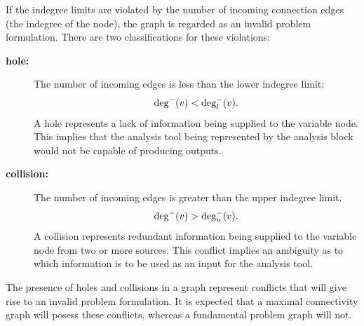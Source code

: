 If the indegree limits are violated by the number of incoming connection edges (the indegree of the node), the graph is regarded as an invalid problem formulation. There are two classifications for these violations:
  \begin{description}
    \item[\bf{hole:}] The number of incoming edges is less than the lower indegree limit:
      \begin{equation} 
\textrm{deg}^-(v) < \textrm{deg}_l^-(v). 
\label{e:hole} 
\end{equation}
      A hole represents a lack of information being supplied to the variable node. This implies that the analysis tool being represented by the analysis block would not be capable of producing outputs.
    \item[\bf{collision:}] The number of incoming edges is greater than the upper indegree limit. 
      \begin{equation} 
\textrm{deg}^-(v) > \textrm{deg}_u^-(v). 
\label{e:collision}
\end{equation}A collision represents redundant information being supplied to the variable node from two or more sources. This conflict implies an ambiguity as to which information is to be used as an input for the analysis tool.
  \end{description} 

%
%


  The presence of holes and collisions in a graph represent conflicts that will give
  rise to an invalid problem formulation. It is expected that a maximal connectivity graph will posess these conflicts, whereas a fundamental problem graph will not.

